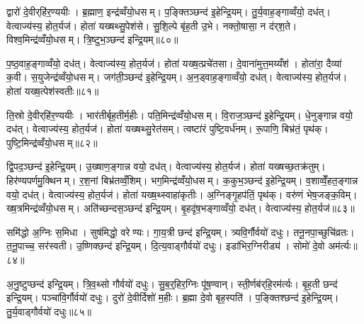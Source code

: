 द्वारो॑ दे॒वीर्‌हि॑र॒ण्ययीः। ब्र॒ह्माण॒ इन्द्र॑व्वँयो॒धसम्। प॒ङ्क्तिञ्छन्द॑ इ॒हेन्द्रि॒यम्। तु॒र्य॒वाह॒ङ्गाव्वँयो॒ दध॑त्। वेत्वाज्य॑स्य॒ होत॒र्यज॑। होता॑ यख्षथ्सु॒पेश॑से। सु॒शि॒ल्पे बृ॑ह॒ती उ॒भे। नक्तो॒षासा॒ न द॑र्‌श॒ते। विश्व॒मिन्द्र॑व्वँयो॒धसम्। त्रि॒ष्टुभ॒ञ्छन्द॑ इन्द्रि॒यम्॥८०॥

प॒ष्ठ॒वाह॒ङ्गाव्वँयो॒ दध॑त्। वेत्वाज्य॑स्य॒ होत॒र्यज॑। होता॑ यख्ष॒त्प्रचे॑तसा। दे॒वाना॑मुत्त॒मय्यँश॑। होता॑रा॒ दैव्या॑ क॒वी। स॒युजेन्द्र॑व्वँयो॒धसम्। जग॑ती॒ञ्छन्द॑ इ॒हेन्द्रि॒यम्। अ॒न॒ड्वाह॒ङ्गाव्वँयो॒ दध॑त्। वेत्वाज्य॑स्य॒ होत॒र्यज॑। होता॑ यख्ष॒त्पेश॑स्वतीः॥८१॥

ति॒स्रो दे॒वीर्‌हि॑र॒ण्ययीः। भार॑तीर्बृह॒तीर्म॒हीः। पति॒मिन्द्र॑व्वँयो॒धसम्। वि॒राज॒ञ्छन्द॑ इ॒हेन्द्रि॒यम्। धे॒नुङ्गान्न वयो॒ दध॑त्। वेत्वाज्य॑स्य॒ होत॒र्यज॑। होता॑ यख्षथ्सु॒रेत॑सम्। त्वष्टा॑रं पुष्टि॒वर्ध॑नम्। रू॒पाणि॒ बिभ्र॑तं॒ पृथ॑क्। पुष्टि॒मिन्द्र॑व्वँयो॒धसम्॥८२॥

द्वि॒पद॒ञ्छन्द॑ इ॒हेन्द्रि॒यम्। उ॒ख्षाण॒ङ्गान्न वयो॒ दध॑त्। वेत्वाज्य॑स्य॒ होत॒र्यज॑। होता॑ यख्षच्छ॒तक्र॑तुम्। हिर॑ण्यपर्णमु॒क्थिनम्। र॒श॒नां बिभ्र॑तव्वँ॒शिम्। भग॒मिन्द्र॑व्वँयो॒धसम्। क॒कुभ॒ञ्छन्द॑ इ॒हेन्द्रि॒यम्। व॒शाव्वेँ॒हत॒ङ्गान्न वयो॒ दध॑त्। वेत्वाज्य॑स्य॒ होत॒र्यज॑। होता॑ यख्ष॒थ्स्वाहा॑कृतीः। अ॒ग्निङ्गृ॒हप॑तिं॒ पृथ॑क्। वरु॑णं भेष॒जङ्क॒विम्। ख्ष॒त्रमिन्द्र॑व्वँयो॒धसम्। अति॑च्छन्दस॒ञ्छन्द॑ इन्द्रि॒यम्। बृ॒हदृ॑ष॒भङ्गाव्वँयो॒ दध॑त्। वेत्वाज्य॑स्य॒ होत॒र्यज॑॥८३॥

समि॑द्धो अ॒ग्निः स॒मिधा। सुष॑मिद्धो॒ वरेण्यः। गा॒य॒त्री छन्द॑ इन्द्रि॒यम्। त्र्यवि॒र्गौर्वयो॑ दधुः। तनू॒नपा॒च्छुचि॑व्रतः। त॒नू॒पाच्च॒ सर॑स्वती। उ॒ष्णिक्छन्द॑ इन्द्रि॒यम्। दि॒त्य॒वाड्गौर्वयो॑ दधुः। इडा॑भिर॒ग्निरीड्य॑। सोमो॑ दे॒वो अम॑र्त्यः॥८४॥

अ॒नु॒ष्टुप्छन्द॑ इन्द्रि॒यम्। त्रि॒व॒थ्सो गौर्वयो॑ दधुः। सु॒ब॒र्॒हिर॒ग्निः पू॑ष॒ण्वान्। स्ती॒र्णब॑र्‌हि॒रम॑र्त्यः। बृ॒ह॒ती छन्द॑ इन्द्रि॒यम्। पञ्चा॑वि॒र्गौर्वयो॑ दधुः। दुरो॑ दे॒वीर्दिशो॑ म॒हीः। ब्र॒ह्मा दे॒वो बृह॒स्पति॑। प॒ङ्क्तिश्छन्द॑ इ॒हेन्द्रि॒यम्। तु॒र्य॒वाड्गौर्वयो॑ दधुः॥८५॥


